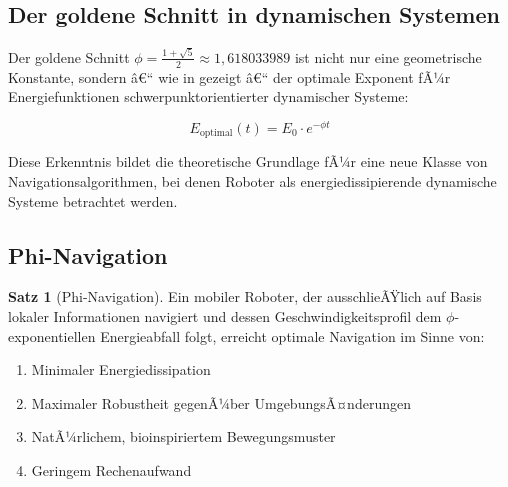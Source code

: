 ﻿\documentclass[a4paper,12pt]{article}
\theoremstyle{definition}
\newtheorem{satz}{Satz}
\begin{document}
\subsection{Der goldene Schnitt in dynamischen Systemen}

Der goldene Schnitt $\phi = \frac{1+\sqrt{5}}{2} \approx 1{,}618033989$ ist nicht nur eine geometrische Konstante, sondern â€“ wie in \cite{phi_energy} gezeigt â€“ der optimale Exponent fÃ¼r Energiefunktionen schwerpunktorientierter dynamischer Systeme:

\begin{equation}
E_{\text{optimal}}(t) = E_0 \cdot e^{-\phi t}
\end{equation}

Diese Erkenntnis bildet die theoretische Grundlage fÃ¼r eine neue Klasse von Navigationsalgorithmen, bei denen Roboter als energiedissipierende dynamische Systeme betrachtet werden.

\subsection{Phi-Navigation}

\begin{satz}[Phi-Navigation]
	Ein mobiler Roboter, der ausschlieÃŸlich auf Basis lokaler Informationen navigiert und dessen Geschwindigkeitsprofil dem $\phi$-exponentiellen Energieabfall folgt, erreicht optimale Navigation im Sinne von:
	\begin{enumerate}
		\item[-] Minimaler Energiedissipation
		\item[-] Maximaler Robustheit gegenÃ¼ber UmgebungsÃ¤nderungen
		\item[-] NatÃ¼rlichem, bioinspiriertem Bewegungsmuster
		\item[-] Geringem Rechenaufwand
	\end{enumerate}
\end{satz}
\end{document}
